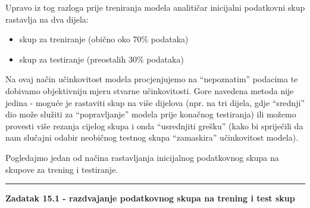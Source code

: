 \documentclass[]{book}
\newenvironment{Shaded}{\begin{snugshade}}{\end{snugshade}}
\newcommand{\KeywordTok}[1]{\textcolor[rgb]{0.13,0.29,0.53}{\textbf{#1}}}
\newcommand{\DataTypeTok}[1]{\textcolor[rgb]{0.13,0.29,0.53}{#1}}
\newcommand{\DecValTok}[1]{\textcolor[rgb]{0.00,0.00,0.81}{#1}}
\newcommand{\StringTok}[1]{\textcolor[rgb]{0.31,0.60,0.02}{#1}}
\newcommand{\CommentTok}[1]{\textcolor[rgb]{0.56,0.35,0.01}{\textit{#1}}}
\newcommand{\OperatorTok}[1]{\textcolor[rgb]{0.81,0.36,0.00}{\textbf{#1}}}
\newcommand{\NormalTok}[1]{#1}
\providecommand{\tightlist}{%
  \setlength{\itemsep}{0pt}\setlength{\parskip}{0pt}}
\theoremstyle{definition}
\theoremstyle{definition}
\theoremstyle{definition}
\theoremstyle{remark}
\begin{document}
Upravo iz tog razloga prije treniranja modela analitičar inicijalni
podatkovni skup rastavlja na dva dijela:

\begin{itemize}
\tightlist
\item
  skup za treniranje (obično oko 70\% podataka)
\item
  skup za testiranje (preostalih 30\% podataka)
\end{itemize}

Na ovaj način učinkovitost modela procjenjujemo na ``nepoznatim''
podacima te dobivamo objektivniju mjeru stvarne učinkovitosti. Gore
navedena metoda nije jedina - moguće je rastaviti skup na više dijelova
(npr. na tri dijela, gdje ``srednji'' dio može služiti za
``popravljanje'' modela prije konačnog testiranja) ili možemo provesti
više rezanja cijelog skupa i onda ``usrednjiti grešku'' (kako bi
spriječili da nam slučajni odabir neobičnog testnog skupa ``zamaskira''
učinkovitost modela).

Pogledajmo jedan od načina rastavljanja inicijalnog podatkovnog skupa na
skupove za trening i testiranje.

\begin{center}\rule{0.5\linewidth}{\linethickness}\end{center}

\textbf{Zadatak 15.1 - razdvajanje podatkovnog skupa na trening i test
skup}

\begin{Shaded}
\end{Shaded}
\end{document}
